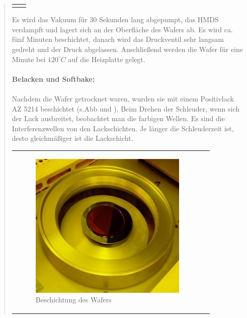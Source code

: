 \begin{quote}
\begin{center}
\begin{tabular}{ll}
\begin{minipage}{0.3\textwidth}
                    \end{minipage}

                \end{tabular}
			\end{center}

    		\vspace{2em}

    		Es wird das Vakuum für 30 Sekunden lang abgepumpt, das HMDS verdampft
    		und lagert sich an der Oberfläche des Wafers ab. Es wird ca. fünf
    		Minuten beschichtet, danach wird das Druckventil sehr langsam
    		gedreht und der Druck abgelassen. Anschließend werden die Wafer
    		für eine Minute bei $120^{\circ}C$ auf die Heizplatte gelegt.\\
			\\
			\textbf{Belacken und Softbake:}\\
			\\
			Nachdem die Wafer getrocknet waren, wurden sie mit einem Positivlack
			AZ 5214 beschichtet (s.Abb  und ). Beim Drehen der Schleuder, wenn
			sich der Lack ausbreitet, beobachtet man die farbigen Wellen. Es
			sind die Interferenzwellen von den Lackschichten. Je länger die
			Schleuderzeit ist, desto gleichmäßiger ist die Lackschicht.

    		\vspace{2em}

    		\begin{center}
                \begin{tabular}{ll}

                \hspace{-14em}
                    \begin{minipage}{0.7\textwidth}
                        \begin{figure}[H]
                        \hspace{5em}
                            \includegraphics[scale=1.0, trim = 0cm 0cm 0cm
                            0cm, clip]{./HerstellungBilder/BeschichtungdesWafers.png}
                            \caption{Beschichtung des Wafers}
                           \label{fig:Beschwaf}
                        \end{figure}


\end{minipage}
\end{tabular}
\end{center}
\end{quote}
